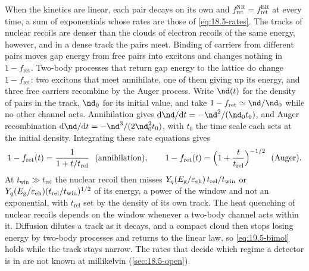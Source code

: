 When the kinetics are linear, each pair decays on its own and $f^{\mathrm{NR}}_{\mathrm{ret}} = f^{\mathrm{ER}}_{\mathrm{ret}}$ at every time, a sum of exponentials whose rates are those of \cref{eq:18.5-rates}. The tracks of nuclear recoils are denser than the clouds of electron recoils of the same energy, however, and in a dense track the pairs meet. Binding of carriers from different pairs moves gap energy from free pairs into excitons and changes nothing in $1 - f_{\mathrm{ret}}$. Two-body processes that return gap energy to the lattice do change $1 - f_{\mathrm{ret}}$: two excitons that meet annihilate, one of them giving up its energy, and three free carriers recombine by the Auger process. Write $\nd(t)$ for the density of pairs in the track, $\nd_0$ for its initial value, and take $1 - f_{\mathrm{ret}} \simeq \nd/\nd_0$ while no other channel acts. Annihilation gives $\dd\nd/\dd t = -\nd^2/(\nd_0t_0)$, and Auger recombination $\dd\nd/\dd t = -\nd^3/(2\nd_0^2t_0)$, with $t_0$ the time scale each sets at the initial density. Integrating these rate equations gives
\begin{equation}
  1 - f_{\mathrm{ret}}(t) = \frac{1}{1 + t/t_{\mathrm{rel}}}\ \ \text{(annihilation)} , \qquad
  1 - f_{\mathrm{ret}}(t) = \Bigl(1 + \frac{t}{t_{\mathrm{rel}}}\Bigr)^{-1/2}\ \ \text{(Auger)} .
  \label{eq:19.5-bimol}
\end{equation}
At $t_{\mathrm{win}} \gg t_{\mathrm{rel}}$ the nuclear recoil then misses $Y_q(E_{\mathrm{g}}/\varepsilon_{\mathrm{eh}})\,t_{\mathrm{rel}}/t_{\mathrm{win}}$ or $Y_q(E_{\mathrm{g}}/\varepsilon_{\mathrm{eh}})(t_{\mathrm{rel}}/t_{\mathrm{win}})^{1/2}$ of its energy, a power of the window and not an exponential, with $t_{\mathrm{rel}}$ set by the density of its own track. The heat quenching of nuclear recoils depends on the window whenever a two-body channel acts within it. Diffusion dilutes a track as it decays, and a compact cloud then stops losing energy by two-body processes and returns to the linear law, so \cref{eq:19.5-bimol} holds while the track stays narrow. The rates that decide which regime a detector is in are not known at millikelvin (\cref{sec:18.5-open}).

